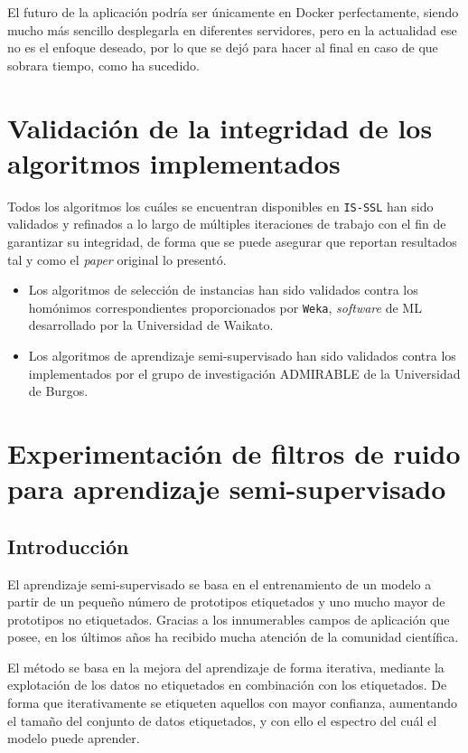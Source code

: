 El futuro de la aplicación podría ser únicamente en Docker perfectamente, siendo mucho más sencillo desplegarla en diferentes servidores, pero en la actualidad ese no es el enfoque deseado, por lo que se dejó para hacer al final en caso de que sobrara tiempo, como ha sucedido.

\section{Validación de la integridad de los algoritmos implementados}
Todos los algoritmos los cuáles se encuentran disponibles en \texttt{IS-SSL} han sido validados y refinados a lo largo de múltiples iteraciones de trabajo con el fin de garantizar su integridad, de forma que se puede asegurar que reportan resultados tal y como el \textit{paper} original lo presentó.

\begin{itemize}
\item Los algoritmos de selección de instancias han sido validados contra los homónimos correspondientes proporcionados por \texttt{Weka}, \textit{software} de ML desarrollado por la Universidad de Waikato.
\item Los algoritmos de aprendizaje semi-supervisado han sido validados contra los implementados por el grupo de investigación ADMIRABLE de la Universidad de Burgos.
\end{itemize}


\section{Experimentación de filtros de ruido para aprendizaje semi-supervisado}

\subsection{Introducción}
El aprendizaje semi-supervisado se basa en el entrenamiento de un modelo a partir de un pequeño número de prototipos etiquetados y uno mucho mayor de prototipos no etiquetados. Gracias a los innumerables campos de aplicación que posee, en los últimos años ha recibido mucha atención de la comunidad científica. 

El método se basa en la mejora del aprendizaje de forma iterativa, mediante la explotación de los datos no etiquetados en combinación con los etiquetados. De forma que iterativamente se etiqueten aquellos con mayor confianza, aumentando el tamaño del conjunto de datos etiquetados, y con ello el espectro del cuál el modelo puede aprender. 

